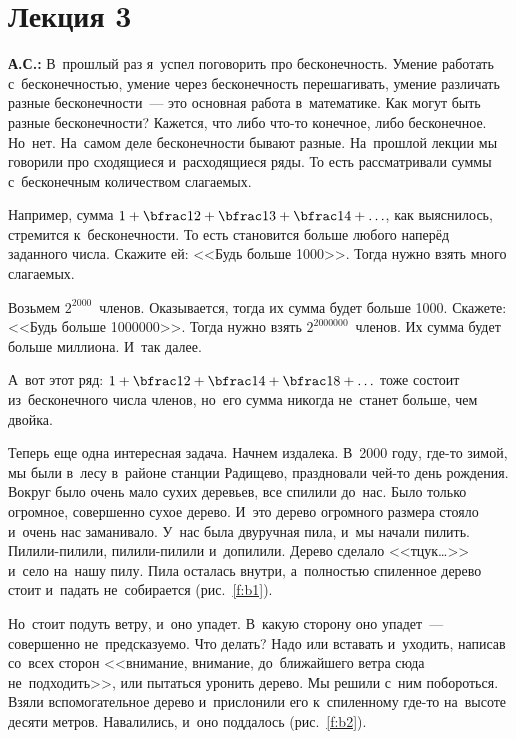 \section{Лекция 3}
\label{1.3}

\textbf{А.С.:} В~прошлый раз я~успел поговорить про бесконечность. Умение работать
с~бесконечностью, умение через бесконечность перешагивать, умение различать разные
бесконечности~--- это основная работа в~математике. Как могут быть разные бесконечности? Кажется,
что либо что-то конечное, либо бесконечное. Но~нет. На~самом деле бесконечности бывают разные.
На~прошлой лекции мы говорили про сходящиеся и~расходящиеся ряды. То есть рассматривали суммы
с~бесконечным количеством слагаемых.

Например, сумма $1 + \bfrac12 + \bfrac13 + \bfrac14 +\ldots$, как выяснилось, стремится к~бесконечности. То есть становится
больше любого наперёд заданного числа. Скажите ей: <<Будь больше 1000>>. Тогда нужно взять много
слагаемых.

Возьмем $2^{2000}$~членов. Оказывается, тогда их сумма будет больше 1000. Скажете: <<Будь больше 1000000>>.
Тогда нужно взять $2^{2000000}$~членов. Их сумма будет больше миллиона. И~так далее.

А~вот этот ряд: $1+\bfrac12+\bfrac14+\bfrac18+\ldots$ тоже состоит из~бесконечного числа членов,
но~его сумма никогда не~станет больше, чем двойка.

Теперь еще одна интересная задача. Начнем издалека. В~2000 году, где-то зимой, мы были в~лесу
в~районе станции Радищево, праздновали чей-то день рождения.
 Вокруг было очень мало сухих деревьев, все
спилили до~нас. Было только огромное, совершенно сухое дерево. И~это дерево огромного размера
стояло и~очень нас заманивало. У~нас была двуручная пила, и~мы начали пилить. Пилили-пилили,
пилили-пилили и~допилили. Дерево сделало <<тцук\ldots>> и~село на~нашу пилу. Пила осталась внутри,
а~полностью спиленное дерево стоит и~падать не~собирается (рис.~\ref{f:b1}).


Но~стоит подуть ветру, и~оно упадет. В~какую сторону оно упадет~--- совершенно не~предсказуемо. Что
делать? Надо или вставать и~уходить, написав со~всех сторон <<внимание, внимание, до~ближайшего
ветра сюда не~подходить>>, или пытаться уронить дерево. Мы решили с~ним побороться.\vadjust{\pagebreak} Взяли
вспомогательное дерево и~прислонили его к~спиленному где-то на~высоте десяти метров. Навалились,
и~оно поддалось (рис.~\ref{f:b2}).

